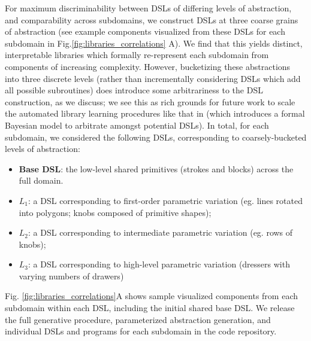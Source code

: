 \documentclass[10pt,letterpaper]{article}
\begin{document}
For maximum discriminability between DSLs of differing levels of abstraction, and comparability across subdomains, we construct DSLs at three coarse grains of abstraction (see example components visualized from these DSLs for each subdomain in Fig.\ref{fig:libraries_correlations} A). We find that this yields distinct, interpretable libraries which formally re-represent each subdomain from components of increasing complexity. However, bucketizing these abstractions into three discrete levels (rather than incrementally considering DSLs which add all possible subroutines) does introduce some arbitrariness to the DSL construction, as we discuss; we see this as rich grounds for future work to scale the automated library learning procedures like that in  (which introduces a formal Bayesian model to arbitrate amongst potential DSLs).
In total, for each subdomain, we considered the following DSLs, corresponding to coarsely-bucketed levels of abstraction:
\begin{itemize}
    \setlength\itemsep{0.1em}
    \item \textbf{Base DSL}: the low-level shared primitives (strokes and blocks) across the full domain.
    
    \item \textbf{$L_1$}: a  DSL corresponding to first-order parametric variation (eg. lines rotated into polygons; knobs composed of primitive shapes);
    
    \item \textbf{$L_2$}: a  DSL corresponding to intermediate parametric variation (eg. rows of knobs);
    
    \item \textbf{$L_3$}: a DSL corresponding to high-level parametric variation (dressers with varying numbers of drawers)
\end{itemize}

Fig. \ref{fig:libraries_correlations}A shows sample visualized components from each subdomain within each DSL, including the initial shared base DSL. We release the full generative procedure, parameterized abstraction generation, and individual DSLs and programs for each subdomain in the code repository.
\end{document}
